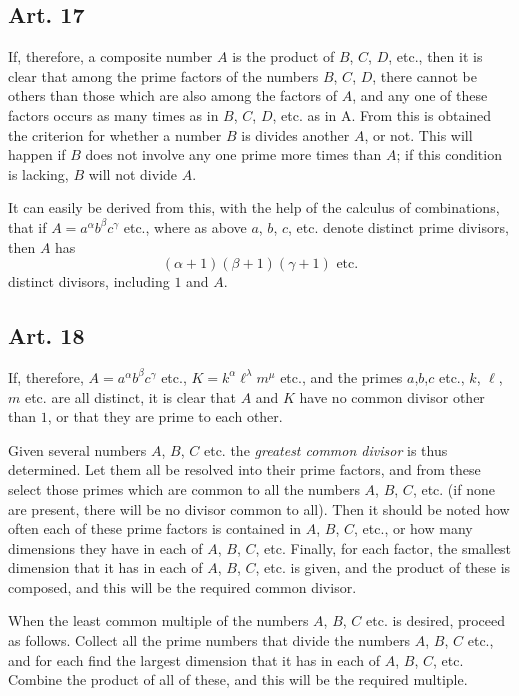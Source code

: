 \documentclass{book}
\theoremstyle{plain}
\theoremstyle{remark}
\begin{document}
\subsection*{Art. 17}

If, therefore, a composite number $A$ is the product of $B$, $C$, $D$, etc., then it is clear that among the prime factors of the numbers $B$, $C$, $D$, there cannot be others than those which are also among the factors of $A$, and any one of these factors occurs as many times as in $B$, $C$, $D$, etc. as in A.  From this is obtained the criterion for whether a number $B$ is divides another $A$, or not.  This will happen if $B$ does not involve any one prime more times than $A$; if this condition is lacking, $B$ will not divide $A$. 

It can easily be derived from this, with the help of the calculus of combinations, that if $A = a^{\alpha} b^{\beta}c^{\gamma}$ etc., where as above $a$, $b$, $c$, etc. denote distinct prime divisors, then $A$ has
\[ (\alpha+1)(\beta+1)(\gamma+1) \textrm{ etc.} \]
distinct divisors, including $1$ and $A$.

\subsection*{Art. 18} 

If, therefore, $A = a^{\alpha}b^{\beta}c^{\gamma}$ etc., $K = k^{\alpha}\ell^{\lambda}m^{\mu}$ etc., and the primes $a$,$b$,$c$ etc., $k$, $\ell$, $m$ etc. are all distinct, it is clear that $A$ and $K$ have no common divisor other than $1$, or that they are prime to each other.

Given several numbers $A$, $B$, $C$ etc. the \emph{greatest common divisor} is thus determined.  Let them all be resolved into their prime factors, and from these select those primes which are common to all the numbers $A$, $B$, $C$, etc. (if none are present, there will be no divisor common to all).  Then it should be noted how often each of these prime factors is contained in $A$, $B$, $C$, etc., or how many dimensions they have in each of $A$, $B$, $C$, etc.  Finally, for each factor, the smallest dimension that it has in each of $A$, $B$, $C$, etc. is given, and the product of these is composed, and this will be the required common divisor.

When the least common multiple of the numbers $A$, $B$, $C$ etc. is desired, proceed as follows.  Collect all the prime numbers that divide the numbers $A$, $B$, $C$ etc., and for each find the largest dimension that it has in each of $A$, $B$, $C$, etc.  Combine the product of all of these, and this will be the required multiple.
\end{document}
